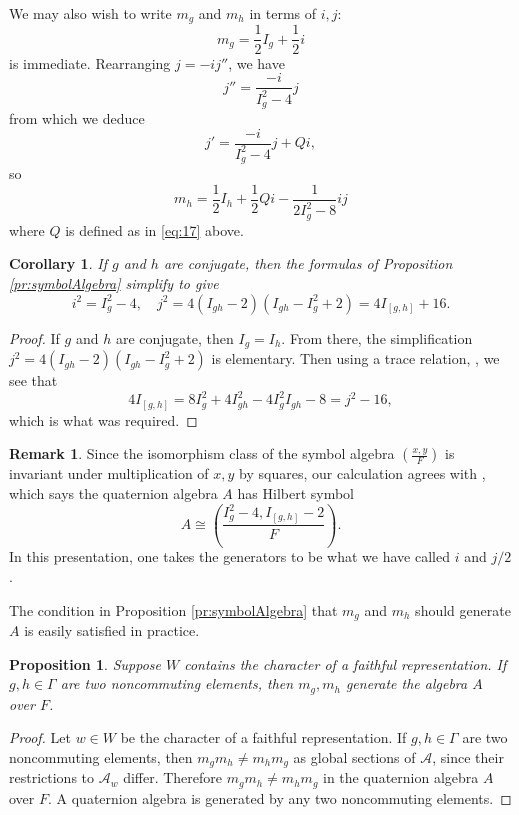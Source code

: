 \documentclass[reqno,oneside,dvipsnames,pdfnames,final]{amsart}
\newtheorem{cor}[thm]{Corollary}
\newtheorem{prop}[thm]{Proposition}
\theoremstyle{definition}
\newtheorem{remk}[thm]{Remark}
\newcommand{\sh}[1]{\mathcal{#1}}
\newcommand{\iso}{\cong}
\begin{document}
We may also wish to write $m_g$ and $m_h$ in terms of $i,j$:
\begin{equation}
  \label{eq:18}
  m_g = \frac{1}{2}I_g + \frac{1}{2} i
\end{equation}
is immediate. Rearranging $j = -i j''$, we have 
\[ j''= \frac{-i}{I_g^2-4}j  \]
from which we deduce
\[ j'=\frac{-i}{I_g^2-4}j+Qi,  \]
so
\begin{equation}
  m_h= \frac{1}{2}I_h+ \frac{1}{2}Qi - \frac{1}{2I_g^2-8}ij\label{eq:19}
\end{equation}
where $Q$ is defined as in \eqref{eq:17} above.

\begin{cor} \label{cor:symbolConjugate}
  If $g$ and $h$ are conjugate, then the formulas of Proposition \ref{pr:symbolAlgebra} simplify to give
  \[i^2= I_g^2 -4, \quad j^2 = 4(I_{gh}-2)(I_{gh}-I_g^2 +2)  = 4I_{[g,h]}+16. \]
\end{cor}
\begin{proof}
  If $g$ and $h$ are conjugate, then $I_g=I_h$. From there, the simplification $j^2 = 4(I_{gh}-2)(I_{gh}-I_g^2 + 2)$ is elementary. Then using a trace relation, \cite[\S3.4, \,
  (3.15)]{MR}, we see that
  \[ 4 I_{[g,h]} = 8I^2_g + 4I^2_{gh} -4I_g^2 I_{gh} - 8 = j^2-16,\]
  which is what was required.
\end{proof}

\begin{remk}
  Since the isomorphism class of the symbol algebra $\left( \frac{x,y}{F} \right)$ is invariant under multiplication of $x,y$ by squares, our calculation agrees with \cite[Cor.~2.9]{Chinburg2020}, which says the quaternion algebra $A$ has Hilbert symbol
  \[ A \iso \left( \frac{I_g^2 -4 , I_{[g,h]} - 2}{F}\right). \] In this presentation, one takes the generators to  be what we have called $i$ and $j/2$.
\end{remk}

The condition in Proposition \ref{pr:symbolAlgebra} that $m_g$ and $m_h$ should generate $A$ is easily satisfied in practice.

\begin{prop}\label{pr:twogen}
  Suppose $W$ contains the character of a faithful representation. If $g, h \in \Gamma$ are two noncommuting elements, then $m_g, m_h$ generate the algebra $A$ over $F$.
\end{prop}
\begin{proof}
   Let $w \in W$ be the character of a faithful representation. If $g,h \in \Gamma$ are two noncommuting elements, then $m_gm_h \neq m_hm_g$ as global sections of $\sh A$, since their restrictions to $\sh A_w$ differ. Therefore $m_g m_h \neq m_hm_g$ in the quaternion algebra $A$ over $F$. A quaternion algebra is generated by any two noncommuting elements.
\end{proof}
\end{document}
